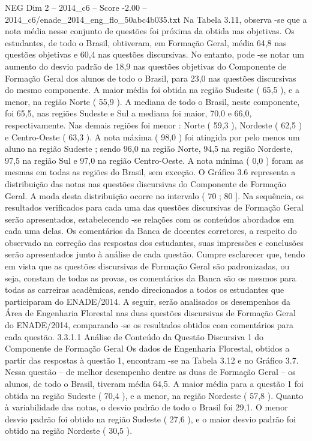 \begin{textsample}{NEG Dim 2 – 2014\_c6 – Score -2.00 – 2014\_c6/enade\_2014\_eng\_flo\_50abc4b035.txt}
Na Tabela 3.11, observa -se que a nota média nesse conjunto de questões foi próxima da obtida nas objetivas.
Os estudantes, de todo o Brasil, obtiveram, em Formação Geral, média 64,8 nas questões objetivas e 60,4 nas questões discursivas.
No entanto, pode -se notar um aumento do desvio padrão de 18,9 nas questões objetivas do Componente de Formação Geral dos alunos de todo o Brasil, para 23,0 nas questões discursivas do mesmo componente.
A maior média foi obtida na região Sudeste ( 65,5 ), e a menor, na região Norte ( 55,9 ).
A mediana de todo o Brasil, neste componente, foi 65,5, nas regiões Sudeste e Sul a mediana foi maior, 70,0 e 66,0, respectivamente.
Nas demais regiões foi menor : Norte ( 59,3 ), Nordeste ( 62,5 ) e Centro-Oeste ( 63,3 ).
A nota máxima ( 98,0 ) foi atingida por pelo menos um aluno na região Sudeste ; sendo 96,0 na região Norte, 94,5 na região Nordeste, 97,5 na região Sul e 97,0 na região Centro-Oeste.
A nota mínima ( 0,0 ) foram as mesmas em todas as regiões do Brasil, sem exceção.
O Gráfico 3.6 representa a distribuição das notas nas questões discursivas do Componente de Formação Geral.
A moda desta distribuição ocorre no intervalo ( 70 ; 80 ].
Na sequência, os resultados verificados para cada uma das questões discursivas de Formação Geral serão apresentados, estabelecendo -se relações com os conteúdos abordados em cada uma delas.
Os comentários da Banca de docentes corretores, a respeito do observado na correção das respostas dos estudantes, suas impressões e conclusões serão apresentados junto à análise de cada questão.
Cumpre esclarecer que, tendo em vista que as questões discursivas de Formação Geral são padronizadas, ou seja, constam de todas as provas, os comentários da Banca são os mesmos para todas as carreiras acadêmicas, sendo direcionados a todos os estudantes que participaram do ENADE/2014.
A seguir, serão analisados os desempenhos da Área de Engenharia Florestal nas duas questões discursivas de Formação Geral do ENADE/2014, comparando -se os resultados obtidos com comentários para cada questão. 3.3.1.1 Análise de Conteúdo da Questão Discursiva 1 do Componente de Formação Geral Os dados de Engenharia Florestal, obtidos a partir das respostas à questão 1, encontram -se na Tabela 3.12 e no Gráfico 3.7.
Nessa questão – de melhor desempenho dentre as duas de Formação Geral – os alunos, de todo o Brasil, tiveram média 64,5.
A maior média para a questão 1 foi obtida na região Sudeste ( 70,4 ), e a menor, na região Nordeste ( 57,8 ).
Quanto à variabilidade das notas, o desvio padrão de todo o Brasil foi 29,1.
O menor desvio padrão foi obtido na região Sudeste ( 27,6 ), e o maior desvio padrão foi obtido na região Nordeste ( 30,5 ).

\end{textsample}
